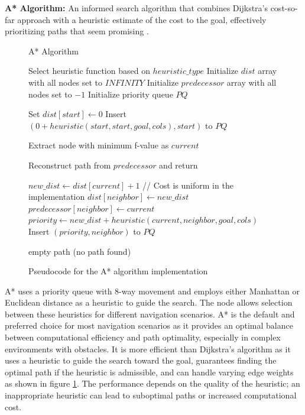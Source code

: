 \documentclass{CSSRforAfrica}
\begin{document}
\noindent \textbf{A* Algorithm:} An informed search algorithm that combines Dijkstra's cost-so-far approach with a heuristic estimate of the cost to the goal, effectively prioritizing paths that seem promising \cite{A*}.
\begin{figure}[H]
	\centering
	\begin{minipage}{0.8\textwidth}
		\begin{algorithm}[H]
			\caption{A* Algorithm}
			\begin{algorithmic}[1]
				\State Select heuristic function based on $heuristic\_type$
				\State Initialize $dist$ array with all nodes set to $INFINITY$
				\State Initialize $predecessor$ array with all nodes set to $-1$
				\State Initialize priority queue $PQ$
				
				\State Set $dist[start] \gets 0$
				\State Insert $(0 + heuristic(start, start, goal, cols), start)$ to $PQ$
				
				\State Extract node with minimum f-value as $current$
				
				\State Reconstruct path from $predecessor$ and return
				\EndIf
				
				\State $new\_dist \gets dist[current] + 1$  // Cost is uniform in the implementation
				\State $dist[neighbor] \gets new\_dist$
				\State $predecessor[neighbor] \gets current$
				\State $priority \gets new\_dist + heuristic(current, neighbor, goal, cols)$
				\State Insert $(priority, neighbor)$ to $PQ$
				\EndIf
				\EndFor
				\EndWhile
				
				\State \Return empty path (no path found)
				\EndFunction
			\end{algorithmic}
		\end{algorithm}
	\end{minipage}
	\caption{Pseudocode for the A* algorithm implementation}
	\label{alg:astar}
\end{figure}



\noindent A* uses a priority queue with 8-way movement and employs either Manhattan or Euclidean distance as a heuristic to guide the search. The node allows selection between these heuristics for different navigation scenarios. A* is the default and preferred choice for most navigation scenarios as it provides an optimal balance between computational efficiency and path optimality, especially in complex environments with obstacles. It is more efficient than Dijkstra's algorithm as it uses a heuristic to guide the search toward the goal, guarantees finding the optimal path if the heuristic is admissible, and can handle varying edge weights as shown in figure \ref{alg:astar}. The performance depends on the quality of the heuristic; an inappropriate heuristic can lead to suboptimal paths or increased computational cost.\\
\end{document}
